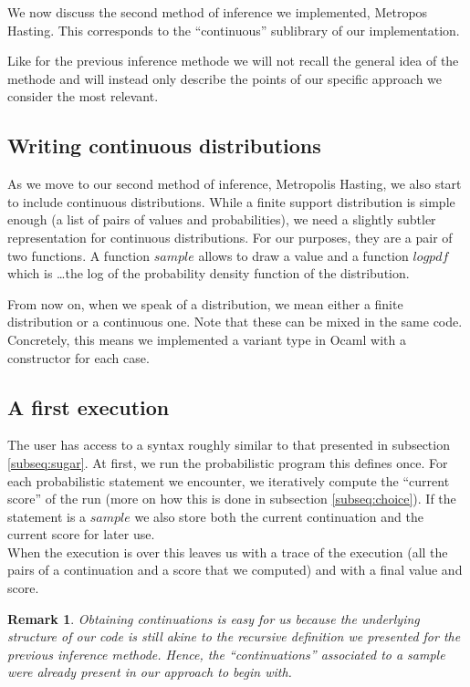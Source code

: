 \documentclass{article}
\newtheorem{remark}{Remark}
\begin{document}
	We now discuss the second method of inference we implemented, Metropos Hasting.
	This corresponds to the ``continuous'' sublibrary of our implementation.
	
	Like for the previous inference methode we will not recall the general idea of the methode and will instead only describe the points of our specific approach we consider the most relevant.

	\subsection{Writing continuous distributions}

	As we move to our second method of inference, Metropolis Hasting, we also start to include continuous distributions.
	While a finite support distribution is simple enough (a list of pairs of values and probabilities), we need a slightly subtler representation for continuous distributions.
	For our purposes, they are a pair of two functions. A function $sample$ allows to draw a value and a function $logpdf$ which is \dots the log of the probability density function of the distribution.

	From now on, when we speak of a distribution, we mean either a finite distribution or a continuous one. Note that these can be mixed in the same code.
	Concretely, this means we implemented a variant type in Ocaml with a constructor for each case.

	\subsection{A first execution}

	The user has access to a syntax roughly similar to that presented in subsection \ref{subseq:sugar}.
	At first, we run the probabilistic program this defines once.
	For each probabilistic statement we encounter, we iteratively compute the ``current score'' of the run (more on how this is done in subsection \ref{subseq:choice}).
	If the statement is a $sample$ we also store both the current continuation and the current score for later use. \\

	When the execution is over this leaves us with a trace of the execution (all the pairs of a continuation and a score that we computed) and with a final value and score. 

	\begin{remark}
	  Obtaining continuations is easy for us because the underlying structure of our code is still akine to the recursive definition we presented for the previous inference methode.
	  Hence, the ``continuations'' associated to a sample were already present in our approach to begin with.
	\end{remark}
\end{document}
